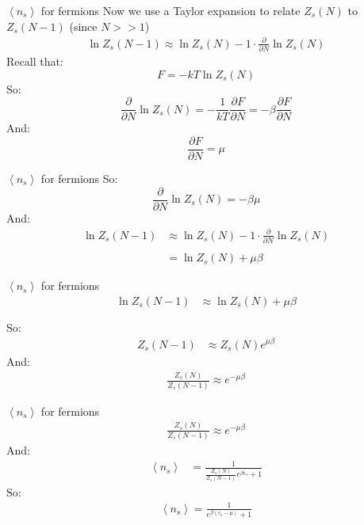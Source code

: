 \documentclass{beamer}
\begin{document}
\begin{frame}{$\left<n_s\right>$ for fermions}
	Now we use a Taylor expansion to relate $Z_s(N)$ to $Z_s(N-1)$ (since $N>>1$)
	\begin{align*}
		\ln{Z_s(N-1)}\approx \ln{Z_s(N)}-1\cdot\frac{\partial}{\partial N}\ln{Z_s(N)}
	\end{align*}
	Recall that:
	\begin{equation*}
		F=-kT\ln{Z_s(N)}
	\end{equation*}
	So:
	\begin{equation*}
		\frac{\partial}{\partial N}\ln{Z_s(N)}=-\frac{1}{kT}\frac{\partial F}{\partial N}=-\beta\frac{\partial F}{\partial N}
	\end{equation*}
And: 
\begin{equation*}
	\frac{\partial F}{\partial N}=\mu
\end{equation*}
\end{frame}



\begin{frame}{$\left<n_s\right>$ for fermions}
	So:
	\begin{equation*}
		\frac{\partial}{\partial N}\ln{Z_s(N)}=-\beta \mu
	\end{equation*}
And:
	\begin{align*}
		\ln{Z_s(N-1)}&\approx \ln{Z_s(N)}-1\cdot\frac{\partial}{\partial N}\ln{Z_s(N)}\\\\
		&=  \ln{Z_s(N)}+\mu\beta
	\end{align*}
\end{frame}




\begin{frame}{$\left<n_s\right>$ for fermions}
	\begin{align*}
		\ln{Z_s(N-1)}&\approx \ln{Z_s(N)}+\mu\beta\\\\
	\end{align*}
So:
	\begin{align*}
		Z_s(N-1)&\approx Z_s(N)e^{\mu\beta}
	\end{align*}
And:
	\begin{align*}
		\frac{Z_s(N)}{Z_s(N-1)}\approx e^{-\mu\beta}
	\end{align*}
\end{frame}




\begin{frame}{$\left<n_s\right>$ for fermions}
	\begin{align*}
		\frac{Z_s(N)}{Z_s(N-1)}\approx e^{-\mu\beta}
	\end{align*}
And:
	\begin{align*}
	\left<n_s\right>
	&=\frac{1}{\frac{Z_s(N)}{Z_s(N-1)}e^{\beta\epsilon_s}+1}
\end{align*}
So:
\begin{align*}
	\left<n_s\right>=\frac{1}{e^{\beta\left(\epsilon_s-\mu\right)}+1}
\end{align*}
\end{frame}
\end{document}
